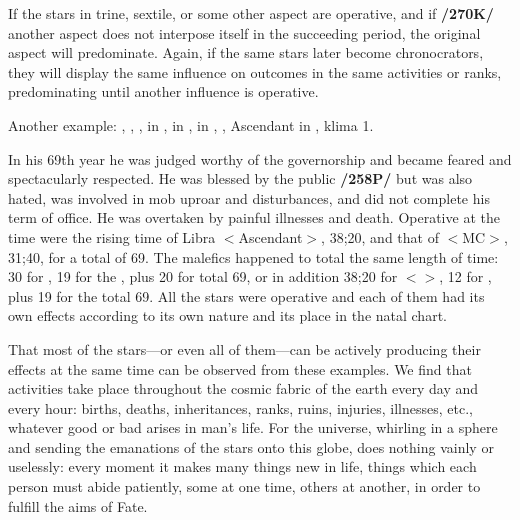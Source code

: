 If the stars in trine, sextile, or some other aspect are operative, and if \textbf{/270K/} another aspect does not interpose itself in the succeeding period, the original aspect will predominate. Again, if the same stars later become chronocrators, they will display the same influence on outcomes in the same activities or ranks, predominating until another influence is operative.

Another example: \Sun, \Saturn, \Jupiter, \Mercury\xspace in \Sagittarius, \Moon\xspace in \Cancer, \Mars\xspace in \Virgo,
\Venus, Ascendant in \Libra, klima 1. 

In his 69th year he was judged worthy of the governorship and became feared and spectacularly respected. He was blessed by the public \textbf{/258P/} but was also hated, was involved in mob uproar and disturbances, and did not complete his term of office. He was overtaken by painful illnesses and death. Operative at the time were the rising time of Libra $<$Ascendant$>$, 38;20, and
that of \Cancer\xspace $<$MC$>$, 31;40, for a total of 69. The malefics happened to total the same length of time: 30 for \Saturn, 19 for the \Sun, plus 20 for \Mercury\xspace total 69, or in addition 38;20 for \Virgo $<$\Mars$>$, 12 for \Jupiter, plus 19 for the \Sun\xspace total 69. All the stars were operative and each of them had its own effects according to its own nature and its place in the natal chart.

That most of the stars—or even all of them—can be actively producing their effects at the same time can be observed from these examples. We find that activities take place throughout the cosmic fabric of the
earth every day and every hour: births, deaths, inheritances, ranks, ruins, injuries, illnesses, etc., whatever good or bad arises in man’s life. For the universe, whirling in a sphere and sending the emanations of the stars onto this globe, does nothing vainly or uselessly: every moment it makes many things new in life, things which each person must abide patiently, some at one time, others at another, in order to fulfill the aims of Fate.

